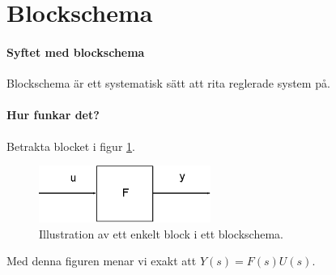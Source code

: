 \section{Blockschema}

\paragraph{Syftet med blockschema}
Blockschema är ett systematisk sätt att rita reglerade system på.

\paragraph{Hur funkar det?}
Betrakta blocket i figur \ref{fig:basic_block}.

\begin{figure}[!ht]
	\centering
	\includegraphics[width = 0.5\textwidth]{./Images/basic_block.eps}
	\caption{Illustration av ett enkelt block i ett blockschema.}
	\label{fig:basic_block}
\end{figure}

Med denna figuren menar vi exakt att $Y(s) = F(s)U(s)$.